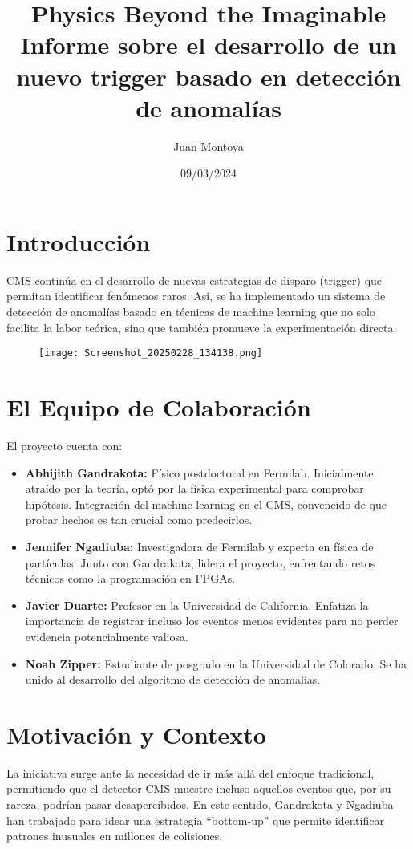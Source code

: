 \documentclass[a4paper,12pt]{article}
\title{Physics Beyond the Imaginable\\[0.5em]
\large Informe sobre el desarrollo de un nuevo trigger basado en detección de anomalías}
\author{Juan Montoya}
\date{09/03/2024}
\begin{document}
\maketitle

\section{Introducción}
CMS continúa en el desarrollo de nuevas estrategias de disparo (trigger) que permitan identificar fenómenos raros. Asi, se ha implementado un sistema de detección de anomalías basado en técnicas de machine learning que no solo facilita la labor teórica, sino que también promueve la experimentación directa.

\begin{figure}[h]
    \centering
    \texttt{[image: Screenshot\_20250228\_134138.png]}
\end{figure}

\section{El Equipo de Colaboración}
El proyecto cuenta con:

\begin{itemize}
    \item \textbf{Abhijith Gandrakota:} Físico postdoctoral en Fermilab. Inicialmente atraído por la teoría, optó por la física experimental para comprobar hipótesis. Integración del machine learning en el CMS, convencido de que probar hechos es tan crucial como predecirlos. 
    \item \textbf{Jennifer Ngadiuba:} Investigadora de Fermilab y experta en física de partículas. Junto con Gandrakota, lidera el proyecto, enfrentando retos técnicos como la programación en FPGAs.
    \item \textbf{Javier Duarte:} Profesor en la Universidad de California. Enfatiza la importancia de registrar incluso los eventos menos evidentes para no perder evidencia potencialmente valiosa.
    \item \textbf{Noah Zipper:} Estudiante de posgrado en la Universidad de Colorado. Se ha unido al desarrollo del algoritmo de detección de anomalías.
\end{itemize}

\section{Motivación y Contexto}
La iniciativa surge ante la necesidad de ir más allá del enfoque tradicional, permitiendo que el detector CMS muestre incluso aquellos eventos que, por su rareza, podrían pasar desapercibidos. En este sentido, Gandrakota y Ngadiuba han trabajado para idear una estrategia “bottom-up” que permite identificar patrones inusuales en millones de colisiones.
\end{document}
